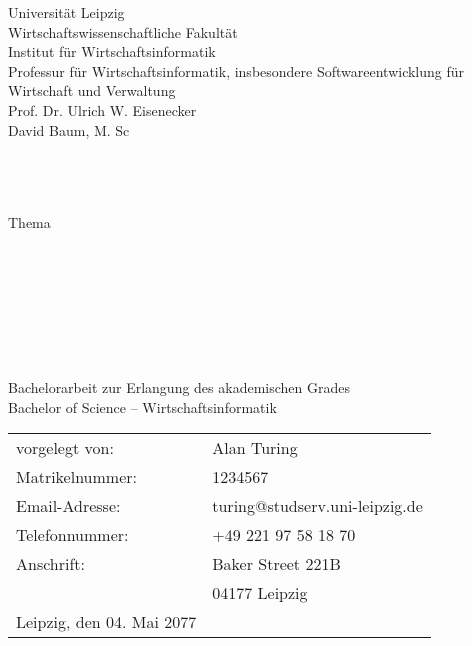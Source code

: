 \begin{titlepage}{
	\sffamily 
	\begin{flushleft}
	\begin{doublespace}
		Universität Leipzig 						\\
		Wirtschaftswissenschaftliche Fakultät				\\
		Institut für Wirtschaftsinformatik				\\
		Professur für Wirtschaftsinformatik, insbesondere Softwareentwicklung für Wirtschaft und Verwaltung	\\
		Prof. Dr. Ulrich W. Eisenecker					\\
		David Baum, M. Sc						\\\ \\\ \\\ \\
	\end{doublespace}
	\end{flushleft}
	\begin{center}
		\begin{large}Thema\end{large}\\\ \\
		\begin{Large}
			\makeatletter
			\textbf{\@title}
			\makeatother
		\end{Large}\\\ \\\ \\\ \\
		
		Bachelorarbeit zur Erlangung des akademischen Grades \\
		Bachelor of Science – Wirtschaftsinformatik

		\vfill
	\end{center}
	\begin{onehalfspace}
	\begin{tabular}{ll}
			vorgelegt von: 	& Alan Turing 		\\
			Matrikelnummer:	& 1234567 		\\
			Email-Adresse: 	& turing@studserv.uni-leipzig.de	\\
			Telefonnummer: 	& +49 221 97 58 18 70	\\
			Anschrift:     	& Baker Street 221B\\
					& 04177 Leipzig	\\
			Leipzig, den 04. Mai 2077
	\end{tabular}\\\ \\\ \
	\end{onehalfspace}
}\end{titlepage} 
